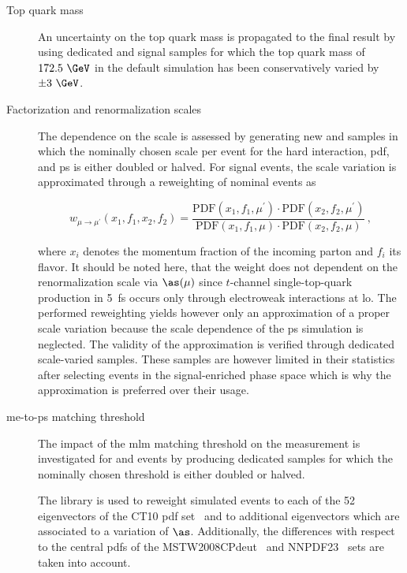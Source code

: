 \begin{description}
\item[Top quark mass] An uncertainty on the top quark mass is propagated to the final result by using dedicated \ttbar and signal samples for which the top quark mass of $172.5~\GeV$ in the default simulation has been conservatively varied by $\pm3~\GeV$.

\item[Factorization and renormalization scales] The dependence on the scale is assessed by generating new \ttbar and \wjets samples in which the nominally chosen scale per event for the hard interaction, \gls{pdf}, and \gls{ps} is either doubled or halved. For signal events, the scale variation is approximated through a reweighting of nominal events as

\begin{equation}
w_{\mu\to \mu^\prime}(x_1,f_1,x_2,f_2)=\frac{\mathrm{PDF}(x_{1},f_{1},\mu^\prime)\cdot\mathrm{PDF}(x_{2},f_{2},\mu^\prime)}{\mathrm{PDF}(x_{1},f_{1},\mu)\cdot\mathrm{PDF}(x_{2},f_{2},\mu)}\,,
\end{equation}

where $x_{i}$ denotes the momentum fraction of the incoming parton and $f_{i}$ its flavor. It should be noted here, that the weight does not dependent on the renormalization scale via $\as(\mu)$ since $t$-channel single-top-quark production in 5~\gls{fs} occurs only through electroweak interactions at \gls{lo}. The performed reweighting yields however only an approximation of a proper scale variation because the scale dependence of the \gls{ps} simulation is neglected. The validity of the approximation is verified through dedicated scale-varied samples. These samples are however limited in their statistics after selecting events in the signal-enriched phase space which is why the approximation is preferred over their usage.
\item[\gls{me}-to-\gls{ps} matching threshold] The impact of the \gls{mlm} matching threshold on the measurement is investigated for \ttbar and \wjets events by producing dedicated samples for which the nominally chosen threshold is either doubled or halved.
 
\item[] The \LHAPDF library is used to reweight simulated events to each of the 52 eigenvectors of the CT10 \gls{pdf} set~\cite{Lai:2010vv} and to additional eigenvectors which are associated to a variation of $\as$. Additionally, the differences with respect to the central \glspl{pdf} of the MSTW2008CPdeut~\cite{Martin:2012da} and NNPDF23~\cite{Ball:2012cx} sets are taken into account.
\end{description}



